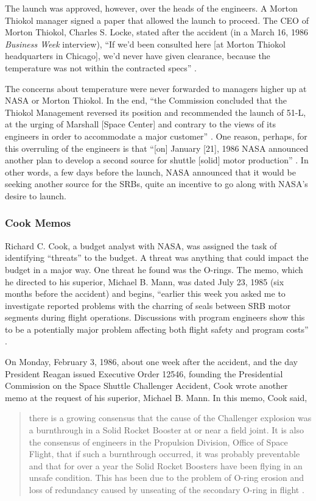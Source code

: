 The launch was approved, however, over the heads of the
engineers.
A Morton Thiokol manager signed a paper that allowed the
launch to proceed.
The CEO of Morton Thiokol, Charles S. Locke, stated after
the accident (in a March 16, 1986 {\em Business Week}
interview), ``If we'd been consulted here [at Morton Thiokol
headquarters in Chicago], we'd never have
given clearance, because the temperature was not within the
contracted specs'' \cite[p. 82]{bw}.


The concerns about temperature were never forwarded to
managers higher up at NASA or Morton Thiokol.
In the end, ``the Commission concluded that the Thiokol
Management reversed its position and recommended the launch
of 51-L, at the urging of Marshall [Space Center] and
contrary to the views of its engineers in order to
accommodate a major customer'' \cite[vol. 1, p.
104]{rogers}. One reason, perhaps, for this overruling of the
engineers is that ``[on] January [21], 1986 NASA announced
another plan to develop a second source for shuttle [solid]
motor production'' \cite{gao86,gao89}.
In other words, a few days before the launch, NASA announced
that it would be seeking another source for the SRBs, quite
an incentive to go along with NASA's desire to launch.

\subsubsection{Cook Memos}

Richard C. Cook, a budget analyst with NASA, was assigned
the task of identifying ``threats'' to the budget.
A threat was anything that could impact the budget in a
major way.
One threat he found was the O-rings.
The memo, which he directed to his superior, Michael B.
Mann, was dated July 23, 1985 (six months before the
accident) and begins, ``earlier this week you asked me to
investigate reported problems with the charring of seals
between SRB motor segments during flight operations.
Discussions with program engineers show this to be a
potentially major problem affecting both flight safety and
program costs'' \cite[vol. 4, p. 391]{rogers}.

On Monday, February 3, 1986, about one week after the accident, and the
day President Reagan issued Executive Order 12546, founding
the Presidential Commission on the Space Shuttle Challenger
Accident, Cook wrote another memo at the request of his
superior, Michael B. Mann.  In this memo, Cook said, 
\begin{singlespace}
\begin{quotation}
\noindent
there is a growing
consensus that the cause of the Challenger explosion was a
burnthrough in a Solid Rocket Booster at or near a field
joint.  It is also the consensus of engineers in the
Propulsion Division, Office of Space Flight, that if such a
burnthrough occurred, it was probably preventable and that
for over a year the Solid Rocket Boosters have been flying
in an unsafe condition.  This has been due to the problem
of O-ring erosion and loss of redundancy caused by unseating
of the secondary O-ring in flight \cite[vol. 4, p.
393]{rogers}.
\end{quotation}
\end{singlespace}
